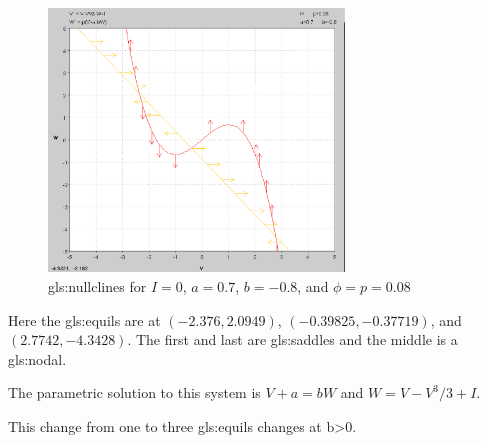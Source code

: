 \documentclass[class={myRUCProject}, crop=false]{standalone}
\begin{document}
\begin{figure}[ht]
    \centering
    \includegraphics[width=0.7\textwidth]{Pictures/Alex/Nullclines - negative.PNG}
    \caption{\Glspl{gls:nullcline} for \(I=0\), \(a=0.7\), \(b=-0.8\), and \(\phi=p=0.08\)}
    \label{fig:nullclines-negative}
\end{figure}

Here the \glspl{gls:equil} are at \((-2.376, 2.0949)\), \((-0.39825, -0.37719)\), and \((2.7742, -4.3428)\). The first and last are \glspl{gls:saddle} and the middle is a \gls{gls:nodal}.

The parametric solution to this system is \(V+a=bW\) and \(W=V-V^3/3+I\).

This change from one to three \glspl{gls:equil} changes at b>0. 

\end{document}
